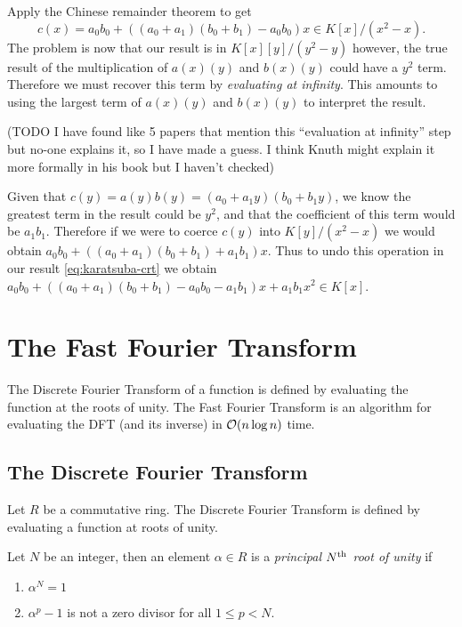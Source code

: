 Apply the Chinese remainder theorem to get
\begin{equation}\label{eq:karatsuba-crt}
    c(x) = a_0b_0 + ((a_0 + a_1)(b_0 + b_1) - a_0b_0)x \in K[x]/(x^2 - x).
\end{equation}
The problem is now that our result is in $K[x][y]/(y^2 - y)$ however, the true result of the multiplication of $a(x)(y)$ and $b(x)(y)$ could have a $y^2$ term. Therefore we must recover this term by \emph{evaluating at infinity}. This amounts to using the largest term of $a(x)(y)$ and $b(x)(y)$ to interpret the result.

\medskip 

(TODO I have found like 5 papers that mention this ``evaluation at infinity'' step but no-one explains it, so I have made a guess. I think Knuth might explain it more formally in his book but I haven't checked)

\medskip 

Given that $c(y) = a(y)b(y) = (a_0 + a_1y)(b_0 + b_1 y)$, we know the greatest term in the result could be $y^2$, and that the coefficient of this term would be $a_1b_1$. Therefore if we were to coerce $c(y)$ into $K[y]/(x^2 - x)$ we would obtain $a_0b_0 + ((a_0 + a_1)(b_0 + b_1) + a_1b_1)x$. Thus to undo this operation in our result \eqref{eq:karatsuba-crt} we obtain $a_0b_0 + ((a_0 + a_1)(b_0 + b_1) - a_0b_0 - a_1b_1)x + a_1b_1x^2 \in K[x]$.

\section{The Fast Fourier Transform}

The Discrete Fourier Transform of a function is defined by evaluating the function at the roots of unity. The Fast Fourier Transform is an algorithm for evaluating the DFT (and its inverse) in $\mathcal O(n \log n)$ time.

\subsection{The Discrete Fourier Transform}

Let $R$ be a commutative ring. The Discrete Fourier Transform is defined by evaluating a function at roots of unity.

\begin{definition}
  Let $N$ be an integer, then an element $\alpha \in R$ is a \emph{principal $N^{\textrm{th}}$ root of unity} if
  \begin{enumerate}
    \item $\alpha^N = 1$
    \item $\alpha^p - 1$ is not a zero divisor for all $1 \leq p < N$.
  \end{enumerate}
\end{definition}

